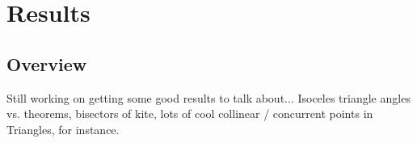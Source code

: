 \chapter{Results}
\label{chap:results}

\section{Overview}

Still working on getting some good results to talk about... Isoceles
triangle angles vs. theorems, bisectors of kite, lots of cool
collinear / concurrent points in Triangles, for instance.
